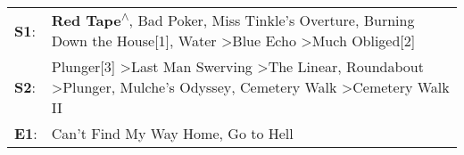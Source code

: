 \begin{supertabular}{p{0.03\textwidth}p{0.92\textwidth}}
 \textbf{S1}:  &                                            \textbf{Red Tape\textsuperscript{$\wedge$}}, \enspace Bad Poker\textsuperscript{}, \enspace Miss Tinkle's Overture\textsuperscript{}, \enspace Burning Down the House[1]\textsuperscript{}, \enspace Water\textsuperscript{} \textgreater \enspace Blue Echo\textsuperscript{} \textgreater \enspace Much Obliged[2]\textsuperscript{}  \enspace  \\
 \textbf{S2}:  &  Plunger[3]\textsuperscript{} \textgreater \enspace Last Man Swerving\textsuperscript{} \textgreater \enspace The Linear\textsuperscript{}, \enspace Roundabout\textsuperscript{} \textgreater \enspace Plunger\textsuperscript{}, \enspace Mulche's Odyssey\textsuperscript{}, \enspace Cemetery Walk\textsuperscript{} \textgreater \enspace Cemetery Walk II\textsuperscript{}  \enspace  \\
 \textbf{E1}:  &                                                                                                                                                                                                                                                                                                   Can't Find My Way Home\textsuperscript{}, \enspace Go to Hell\textsuperscript{}  \enspace  \\
\end{supertabular}

